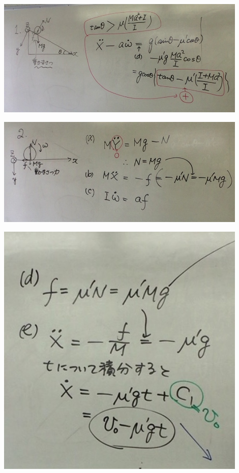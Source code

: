 \documentclass{jsarticle}
\begin{document}
	\begin{center}
		\includegraphics[width=12cm]{5_27_4.JPG}
	\end{center}
	\begin{center}
		\includegraphics[width=12cm]{5_27_5.JPG}
	\end{center}
	\begin{center}
		\includegraphics[width=12cm]{5_27_6.JPG}
	\end{center}
\end{document}
